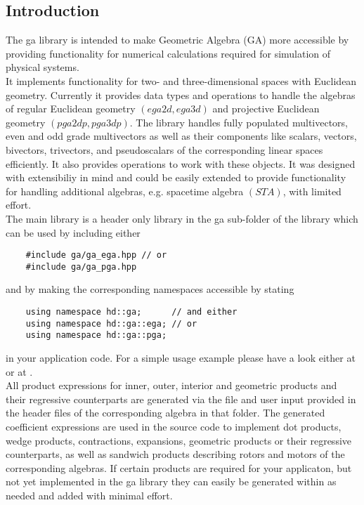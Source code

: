 \subsection{Introduction}
\label{intro}

The ga library is intended to make Geometric Algebra (GA) more accessible by providing
functionality for numerical calculations required for simulation of physical systems. \\

It implements functionality for two- and three-dimensional spaces with Euclidean geometry.
Currently it provides data types and operations to handle the algebras of regular
Euclidean geometry $(ega2d, ega3d)$ and projective Euclidean geometry $(pga2dp, pga3dp)$.
The library handles fully populated multivectors, even and odd grade multivectors as well
as their components like scalars, vectors, bivectors, trivectors, and pseudoscalars of the
corresponding linear spaces efficiently. It also provides operations to work with these
objects. It was designed with extensibiliy in mind and could be easily extended to provide
functionality for handling additional algebras, e.g. spacetime algebra $(STA)$, with
limited effort. \\

The main library is a header only library in the ga sub-folder of the library which can be
used by including either
\begin{verbatim}
    #include ga/ga_ega.hpp // or
    #include ga/ga_pga.hpp
\end{verbatim}
and by making the corresponding namespaces accessible by stating
\begin{verbatim}
    using namespace hd::ga;      // and either
    using namespace hd::ga::ega; // or
    using namespace hd::ga::pga;
\end{verbatim}
in your application code. For a simple usage example please have a look either at
 or at .
\\

All product expressions for inner, outer, interior and geometric products and their
regressive counterparts are generated via the file  and
user input provided in the header files of the corresponding algebra in that folder. The
generated coefficient expressions are used in the source code to implement dot products,
wedge products, contractions, expansions, geometric products or their regressive
counterparts, as well as sandwich products describing rotors and motors of the
corresponding algebras. If certain products are required for your applicaton, but not yet
implemented in the ga library they can easily be generated within
 as needed and added with minimal effort. \\

